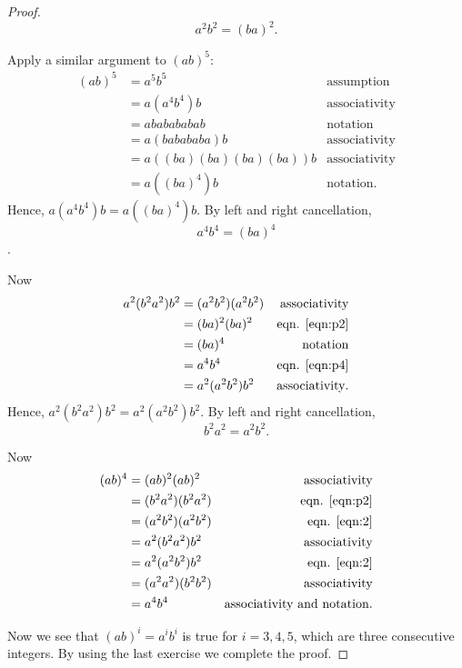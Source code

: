 \begin{enumerate}[resume]
\begin{proof}
\begin{equation}
	\label{eqn:p2}
	a^2b^2 = (ba)^2.
\end{equation}

Apply a similar argument to $(ab)^5$:
\begin{align*}
		(ab)^{5} &= a^5 b^5 &\text{assumption}\\
			 &= a(a^4b^4)b &\text{associativity} \\
			 &= ababababab &\text{notation} \\
			 &= a(babababa)b &\text{associativity}\\
			 &= a((ba)(ba)(ba)(ba))b &\text{associativity}\\
			 &= a((ba)^4)b &\text{notation}
	.\end{align*}
Hence, $a(a^4b^4)b = a((ba)^4)b $. By left and right cancellation,
\begin{equation}
	\label{eqn:p4}
	a^4b^4 = (ba)^4
\end{equation}
.

Now
\begin{align*}
	a^2(b^2a^2)b^2 &= (a^2b^2)(a^2b^2) &\text{associativity} \\
		       &=  (ba)^2   (ba)^2   &\text{eqn. \eqref{eqn:p2}} \\
	&= (ba)^4 &\text{notation} \\
	&= a^4 b^4 &\text{eqn. \eqref{eqn:p4}}\\
	&= a^2 (a^2 b^2) b^2 &\text{associativity}
.\end{align*}
Hence, $a^2(b^2a^2)b^2 = a^2(a^2b^2)b^2$. By left and right cancellation,
\begin{equation}
	\label{eqn:2}
	b^2a^2 = a^2b^2.
\end{equation}



Now
\begin{align*}
	(ab)^4 &= (ab)^2 (ab)^2 &\text{associativity} \\
	       &=  (b^2 a^2)(b^2 a^2) &\text{eqn. \eqref{eqn:p2}}\\
	       &=  (a^2 b^2)(a^2b^2) &\text{eqn. \eqref{eqn:2}}\\
	       &= a^2 (b^2 a^2) b^2 &\text{associativity} \\
	       &= a^2 (a^2 b^2) b^2 &\text{eqn. \eqref{eqn:2}}\\
	       &= (a^2a^2)(b^2b^2) &\text{associativity} \\
	       &= a^4b^4 &\text{associativity and notation}
.\end{align*}

Now we see that $(ab)^i = a^i b^i$ is true for $i = 3,4,5$, which are three consecutive integers. By using the last exercise we complete the proof.
\end{proof}

\end{enumerate}
